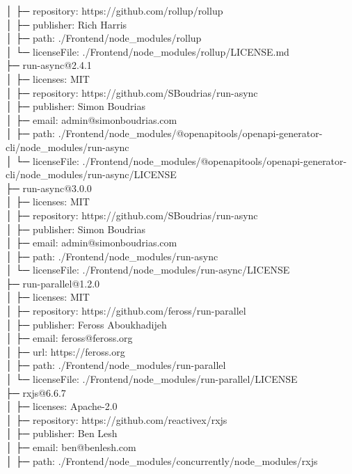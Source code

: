 │  ├─ repository: https://github.com/rollup/rollup\\
│  ├─ publisher: Rich Harris\\
│  ├─ path: ./Frontend/node\_modules/rollup\\
│  └─ licenseFile: ./Frontend/node\_modules/rollup/LICENSE.md\\
├─ run-async@2.4.1\\
│  ├─ licenses: MIT\\
│  ├─ repository: https://github.com/SBoudrias/run-async\\
│  ├─ publisher: Simon Boudrias\\
│  ├─ email: admin@simonboudrias.com\\
│  ├─ path: ./Frontend/node\_modules/@openapitools/openapi-generator-cli/node\_modules/run-async\\
│  └─ licenseFile: ./Frontend/node\_modules/@openapitools/openapi-generator-cli/node\_modules/run-async/LICENSE\\
├─ run-async@3.0.0\\
│  ├─ licenses: MIT\\
│  ├─ repository: https://github.com/SBoudrias/run-async\\
│  ├─ publisher: Simon Boudrias\\
│  ├─ email: admin@simonboudrias.com\\
│  ├─ path: ./Frontend/node\_modules/run-async\\
│  └─ licenseFile: ./Frontend/node\_modules/run-async/LICENSE\\
├─ run-parallel@1.2.0\\
│  ├─ licenses: MIT\\
│  ├─ repository: https://github.com/feross/run-parallel\\
│  ├─ publisher: Feross Aboukhadijeh\\
│  ├─ email: feross@feross.org\\
│  ├─ url: https://feross.org\\
│  ├─ path: ./Frontend/node\_modules/run-parallel\\
│  └─ licenseFile: ./Frontend/node\_modules/run-parallel/LICENSE\\
├─ rxjs@6.6.7\\
│  ├─ licenses: Apache-2.0\\
│  ├─ repository: https://github.com/reactivex/rxjs\\
│  ├─ publisher: Ben Lesh\\
│  ├─ email: ben@benlesh.com\\
│  ├─ path: ./Frontend/node\_modules/concurrently/node\_modules/rxjs\\

